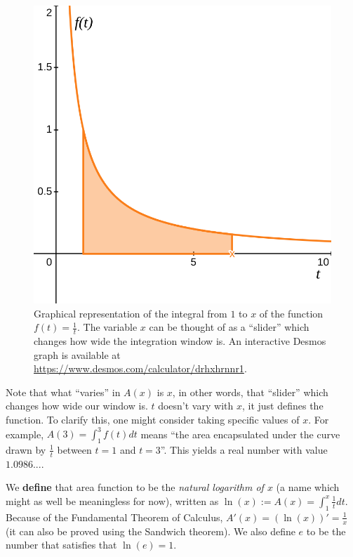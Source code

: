 \begin{figure}[H]
	\centering
	\includegraphics[width=\linewidth]{media/lnx.png}
	\caption{Graphical representation of the integral from $1$ to $x$ of the function $f(t) = \frac{1}{t}$. The variable $x$ can be thought of as a \enquote{slider} which changes how wide the integration window is. An interactive Desmos graph is available at \url{https://www.desmos.com/calculator/drhxhrnnr1}.}
	\label{graph}
\end{figure}

Note that what \enquote{varies} in $A(x)$ is $x$, in other words, that \enquote{slider} which changes how wide our window is. $t$ doesn't vary with $x$, it just defines the function. To clarify this, one might consider taking specific values of $x$. For example, $A(3) = \int_{1}^{3} f(t) dt$ means \enquote{the area encapsulated under the curve drawn by $\frac{1}{t}$ between $t = 1$ and $t = 3$}. This yields a real number with value $1.0986...$.

We \textbf{define} that area function to be the \textit{natural logarithm of $x$} (a name which might as well be meaningless for now), written as $\ln(x) := A(x) = \int_{1}^{x} \frac{1}{t} dt$. Because of the Fundamental Theorem of Calculus, $A'(x) = (\ln(x))' = \frac{1}{x}$ (it can also be proved using the Sandwich theorem). We also define $e$ to be the number that satisfies that $\ln(e) = 1$. 

